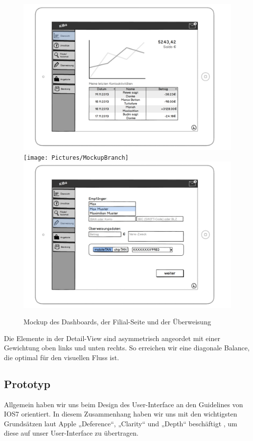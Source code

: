 \begin{figure}[p]
	\centering
	\includegraphics[scale=.52]{Pictures/MockupDashboard}\\
	\texttt{[image: Pictures/MockupBranch]}\\
	\includegraphics[scale=.52]{Pictures/MockupTransition}
	\caption{Mockup des Dashboards, der Filial-Seite und der Überweisung}
\end{figure}

	Die Elemente in der Detail-View sind asymmetrisch angeordet mit einer Gewichtung oben links und unten rechts. So erreichen wir eine diagonale Balance, die optimal für den visuellen Fluss ist.

\subsection{Prototyp}
	Allgemein haben wir uns beim Design des User-Interface an den Guidelines von IOS7 orientiert. In diesem Zusammenhang haben wir uns mit den wichtigsten Grundsätzen laut Apple „Deference“, „Clarity“ und „Depth“ beschäftigt \citep{Apple14}, um diese auf unser User-Interface zu übertragen. 
	
